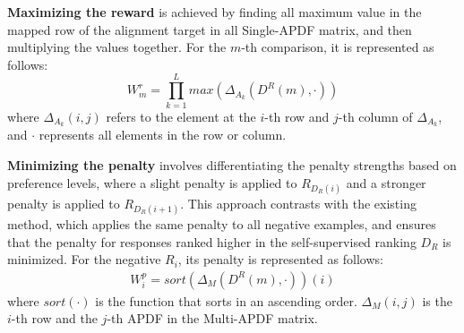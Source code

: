 \textbf{Maximizing the reward} is achieved by finding all maximum value in the mapped row of the alignment target in all Single-APDF matrix, and then multiplying the values together. For the \(m\)-th comparison, it is represented as follows:
\begin{equation}
  W_{m}^{r}= {\textstyle \prod_{k=1}^{L}} max(\Delta_{A_k}(D^R(m),\cdot))
\end{equation}
where \(\Delta_{A_k}(i, j)\) refers to the element at the \(i\)-th row and \(j\)-th column of \(\Delta_{A_k}\), and \(\cdot\) represents all elements in the row or column.

\textbf{Minimizing the penalty} involves differentiating the penalty strengths based on preference levels, where a slight penalty is applied to \( R_{D_R(i)} \) and a stronger penalty is applied to \( R_{D_R(i+1)} \). This approach contrasts with the existing method, which applies the same penalty to all negative examples, and ensures that the penalty for responses ranked higher in the self-supervised ranking \( D_R \) is minimized.
For the negative \( R_i \), its penalty is represented as follows:
\begin{equation}
\begin{aligned}
     W_{i}^{p}  =  sort(\Delta_{M}(D^R(m),\cdot ))(i)
\end{aligned}
\end{equation}
where \(sort(\cdot)\) is the function that sorts in an ascending order. 
\(\Delta_{M}(i, j)\) is the \(i\)-th row and the \(j\)-th APDF in the Multi-APDF matrix.

